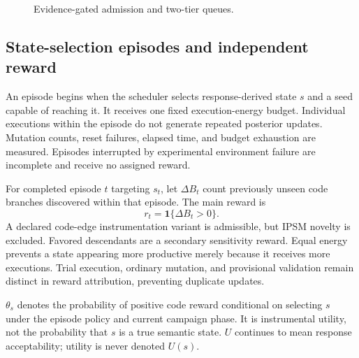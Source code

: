 \documentclass[final,5p,times,number]{elsarticle}
\begin{document}
\begin{figure}[!tbp]
\caption{Evidence-gated admission and two-tier queues.}
\label{fig:architecture}
\end{figure}

\subsection{State-selection episodes and independent reward}
An episode begins when the scheduler selects response-derived state $s$ and a seed capable of reaching it. It receives one fixed execution-energy budget. Individual executions within the episode do not generate repeated posterior updates. Mutation counts, reset failures, elapsed time, and budget exhaustion are measured. Episodes interrupted by experimental environment failure are incomplete and receive no assigned reward.

For completed episode $t$ targeting $s_t$, let $\Delta B_t$ count previously unseen code branches discovered within that episode. The main reward is
\begin{equation}
r_t=\mathbf{1}\{\Delta B_t>0\}.
\label{eq:reward}
\end{equation}
A declared code-edge instrumentation variant is admissible, but IPSM novelty is excluded. Favored descendants are a secondary sensitivity reward. Equal energy prevents a state appearing more productive merely because it receives more executions. Trial execution, ordinary mutation, and provisional validation remain distinct in reward attribution, preventing duplicate updates.

$\theta_s$ denotes the probability of positive code reward conditional on selecting $s$ under the episode policy and current campaign phase. It is instrumental utility, not the probability that $s$ is a true semantic state. $U$ continues to mean response acceptability; utility is never denoted $U(s)$.
\end{document}
